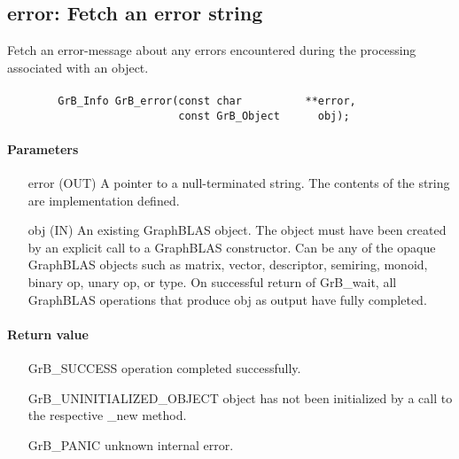 \subsection{{\sf error}: Fetch an error string}
\label{Sec:GrB_error}

Fetch an error-message about any errors encountered during the processing associated with an object.

\paragraph{\syntax}

\begin{verbatim}
        GrB_Info GrB_error(const char          **error,
                           const GrB_Object      obj);
\end{verbatim}

\paragraph{Parameters}

\begin{itemize}[leftmargin=1.1in]
	\item[{\sf error}] ({\sf OUT}) A pointer to a null-terminated
		string. The contents of the string are implementation
		defined.

        \item[{\sf obj}] ({\sf IN}) An existing GraphBLAS object.
        The object must have been created by an explicit call to a
        GraphBLAS constructor.  Can be any of the opaque GraphBLAS
        objects such as matrix, vector, descriptor, semiring, monoid,
        binary op, unary op, or type. On successful return of {\sf
        GrB\_wait}, all GraphBLAS operations that produce {\sf obj}
        as output have fully completed.
\end{itemize}


\paragraph{Return value}
\begin{itemize}[leftmargin=2.3in]
	\item[{\sf GrB\_SUCCESS}]			operation completed successfully.
	\item[{\sf GrB\_UNINITIALIZED\_OBJECT}]		object has not been initialized by a call to the respective {\sf *\_new} method.
	\item[{\sf GrB\_PANIC}]				unknown internal error.
\end{itemize}

